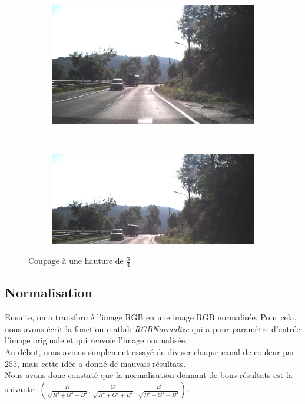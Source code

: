\documentclass[11pt, french]{article}
\begin{document}
\begin{figure}[h]
    \centering
    \begin{subfigure}[b]{0.4\textwidth}
        \includegraphics[width=\textwidth]{1.png}
        \caption{}
        \label{fig:1}
    \end{subfigure}
    ~ %
    \begin{subfigure}[b]{0.4\textwidth}
        \includegraphics[width=\textwidth]{tag1.png}
        \caption{}
        \label{fig:tag1}
    \end{subfigure}
    
    
    \caption{Coupage à une hauture de $\frac{3}{4}$}\label{fig:taglio}
\end{figure}
 
\subsection{Normalisation} 
Ensuite, on a transformé l'image RGB en une image RGB normalisée. Pour cela, nous avons écrit la fonction matlab \textit{RGBNormalize} qui a pour paramètre d'entrée l'image originale et qui renvoie l'image normalisée.\\
Au début, nous avions simplement essayé de diviser chaque canal de couleur par $255$, mais cette idée a donné de mauvais résultats.\\
Nous avons donc constaté que la normalisation donnant de bons résultats est la suivante:
$ \left( \frac{R}{\sqrt{R^2+G^2+B^2}}, \frac{G}{\sqrt{R^2+G^2+B^2}} , \frac{B}{\sqrt{R^2+G^2+B^2}} \right)$.
\end{document}
